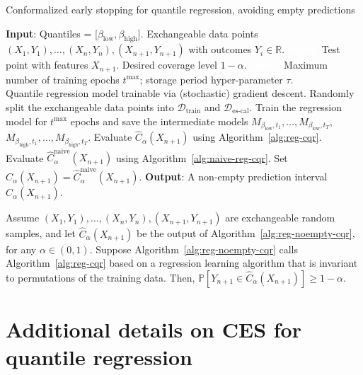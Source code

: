 \begin{algorithm}[H]
    \color{blue}
    \caption{Conformalized early stopping for quantile regression, avoiding empty predictions}
    \label{alg:reg-noempty-cqr}
    \begin{algorithmic}[1]
        \STATE \textbf{Input}: Quantiles = [$\beta_{\text{low}}, \beta_{\text{high}}$]. Exchangeable data points $(X_{1},Y_{1}), \ldots, (X_{n},Y_{n}), (X_{n+1},Y_{n+1})$ with outcomes $Y_i \in \mathbb{R}$.
        \STATE \textcolor{white}{\textbf{Input}:} Test point with features $X_{n+1}$. Desired coverage level $1-\alpha$.
        \STATE \textcolor{white}{\textbf{Input}:} Maximum number of training epochs $t^{\max}$; storage period hyper-parameter $\tau$.
        \STATE \textcolor{white}{\textbf{Input}:} Quantile regression model trainable via (stochastic) gradient descent.
        \STATE Randomly split the exchangeable data points into $\mathcal{D}_{\text{train}}$ and $\mathcal{D}_{\text{es-cal}}$.
        \STATE Train the regression model for $t^{\text{max}}$ epochs and save the intermediate models $M_{\beta_{\text{low}}, t_1} , \dots, M_{\beta_{\text{low}}, t_T}$, $M_{\beta_{\text{high}}, t_1} , \dots, M_{\beta_{\text{high}}, t_T}$.
        \STATE Evaluate $\hat{C}_{\alpha}(X_{n+1})$ using Algorithm~\ref{alg:reg-cqr}.
        \STATE Evaluate $\hat{C}^{\text{naive}}_{\alpha}(X_{n+1})$ using Algorithm~\ref{alg:naive-reg-cqr}. Set $\hat{C}_{\alpha}(X_{n+1}) = \hat{C}^{\text{naive}}_{\alpha}(X_{n+1})$.
        \ENDIF
        \STATE \textbf{Output}: A non-empty prediction interval $\hat{C}_{\alpha}(X_{n+1})$.
    \end{algorithmic}
\end{algorithm}

\color{blue}
\begin{corollary}\label{thm:reg-noempty-cqr}
Assume $(X_{1},Y_{1}), \ldots, (X_{n},Y_{n}), (X_{n+1},Y_{n+1})$ are exchangeable random samples, and let $\hat{C}_{\alpha}(X_{n+1})$ be the output of Algorithm~\ref{alg:reg-noempty-cqr}, for any $\alpha \in (0,1)$. Suppose Algorithm~\ref{alg:reg-noempty-cqr} calls Algorithm~\ref{alg:reg-cqr} based on a regression learning algorithm that is invariant to permutations of the training data. Then, $\mathbb{P}[Y_{n+1} \in \hat{C}_{\alpha}(X_{n+1})] \geq 1-\alpha$.
\end{corollary}

\section{Additional details on CES for quantile regression} \label{sec:quantile-regression-review}

